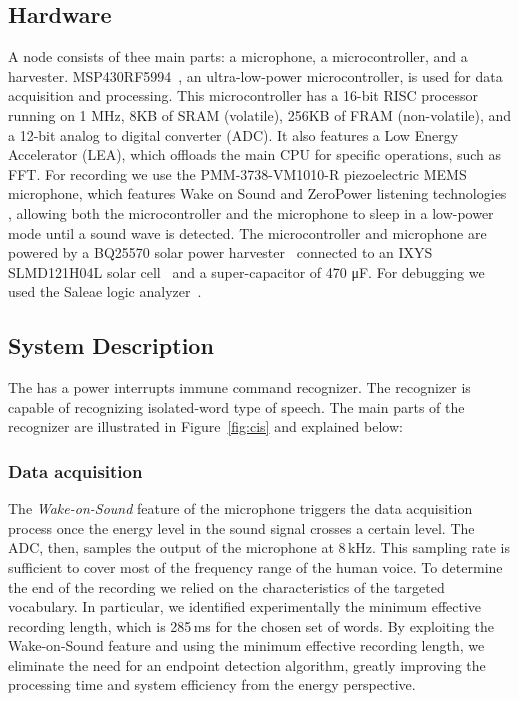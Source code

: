 \subsection{Hardware}
\label{sec:hardware}
A \cim node consists of thee main parts: a microphone, a microcontroller, and a harvester. MSP430RF5994~\cite{ti_msp430_website}, an ultra-low-power microcontroller, is used for data acquisition and processing. This microcontroller has a 16-bit RISC processor running on 1 MHz, 8KB of SRAM (volatile), 256KB of FRAM (non-volatile), and a 12-bit analog to digital converter (ADC). It also features a Low Energy Accelerator (LEA), which offloads the main CPU for specific operations, such as FFT. For recording we use the PMM-3738-VM1010-R piezoelectric MEMS microphone, which features Wake on Sound and ZeroPower listening technologies \cite{microphone}, allowing both the microcontroller and the microphone to sleep in a low-power mode until a sound wave is detected.
The microcontroller and microphone are powered by a BQ25570 solar power harvester~\cite{BQ25570EVM-206_website} connected to an IXYS SLMD121H04L solar cell~\cite{SLMD121H04L_website} and a super-capacitor of 470 \si{\micro F}. For debugging we used the Saleae logic analyzer~\cite{saleae}.

\subsection{System Description}
The \cim has a power interrupts immune command recognizer. The recognizer is capable of recognizing isolated-word type of speech. 
The main parts of the recognizer are illustrated in Figure~\ref{fig:cis} and explained below:

\subsubsection{Data acquisition}
The \textit{Wake-on-Sound} feature of the microphone triggers the data acquisition process once the energy level in the sound signal crosses a certain level. The ADC, then, samples the output of the microphone at 8\,kHz. This sampling rate is sufficient to cover most of the frequency range of the human voice. To determine the end of the recording we relied on the characteristics of the targeted vocabulary. In particular, we identified experimentally the minimum effective recording length, which is 
285\,ms for the chosen set of words. By exploiting the Wake-on-Sound feature and using the minimum effective recording length, we eliminate the need for an endpoint detection algorithm, greatly improving the processing time and system efficiency from the energy perspective.



